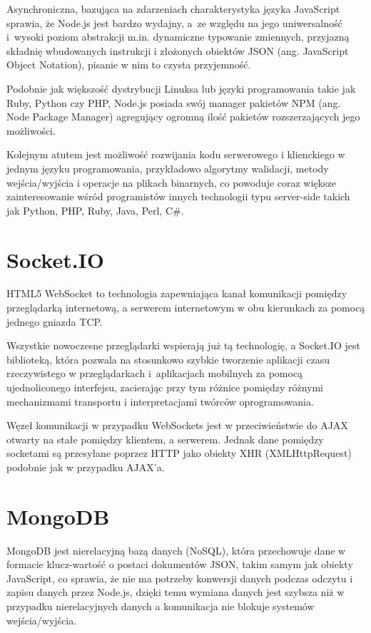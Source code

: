 \documentclass[twoside,a4paper,openright,12pt]{book}
\begin{document}
Asynchroniczna, bazująca na zdarzeniach charakterystyka języka JavaScript sprawia, że Node.js jest bardzo wydajny, a~ze względu na jego uniwersalność i~wysoki poziom abstrakcji m.in. dynamiczne typowanie zmiennych, przyjazną składnię wbudowanych instrukcji i złożonych obiektów JSON (ang. JavaScript Object Notation), pisanie w nim to czysta przyjemność.

Podobnie jak większość dystrybucji Linuksa lub języki programowania takie jak Ruby, Python czy PHP, Node.js posiada swój manager pakietów NPM (ang. Node Package Manager) agregujący ogromną ilość pakietów rozszerzających jego możliwości.

Kolejnym atutem jest możliwość rozwijania kodu serwerowego i klienckiego w jednym języku programowania, przykładowo algorytmy walidacji, metody wejścia/wyjścia i operacje na plikach binarnych, co powoduje coraz większe zainteresowanie wśród programistów innych technologii typu server-side takich jak Python, PHP, Ruby, Java, Perl, C\#.


\section{Socket.IO}

HTML5 WebSocket to technologia zapewniająca kanał komunikacji pomiędzy przeglądarką internetową, a serwerem internetowym w obu kierunkach za pomocą jednego gniazda TCP.

Wszystkie nowoczesne przeglądarki wspierają już tą technologię, a Socket.IO jest biblioteką, która pozwala na stosunkowo szybkie tworzenie aplikacji czasu rzeczywistego w przeglądarkach i~aplikacjach mobilnych za pomocą ujednoliconego interfejsu, zacierając przy tym różnice pomiędzy różnymi mechanizmami transportu i interpretacjami twórców oprogramowania.

Węzeł komunikacji w przypadku WebSockets jest w przeciwieństwie do AJAX otwarty na stałe pomiędzy klientem, a serwerem. Jednak dane pomiędzy socketami są przesyłane poprzez HTTP jako obiekty XHR (XMLHttpRequest) podobnie jak w przypadku AJAX'a. \cite{croucher2012node}


\section{MongoDB}

MongoDB jest nierelacyjną bazą danych (NoSQL), która przechowuje dane w formacie klucz-wartość o postaci dokumentów JSON, takim samym jak obiekty JavaScript, co sprawia, że nie ma potrzeby konwersji danych podczas odczytu i zapisu danych przez Node.js, dzięki temu wymiana danych jest szybsza niż w przypadku nierelacyjnych danych a komunikacja nie blokuje systemów wejścia/wyjścia.
\end{document}
